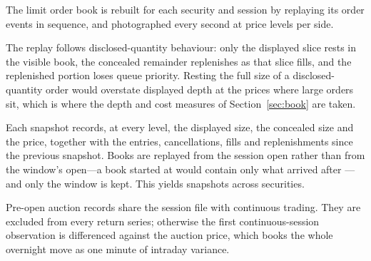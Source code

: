 The limit order book is rebuilt for each security and session by replaying its order events
in sequence, and photographed every \DesignSnapshotInterval{} second at
\DesignBookLevels{} price levels per side.

The replay follows disclosed-quantity behaviour: only the displayed slice rests in the
visible book, the concealed remainder replenishes as that slice fills, and the replenished
portion loses queue priority. Resting the full size of a disclosed-quantity order would
overstate displayed depth at the prices where large orders sit, which is where the depth and
cost measures of Section~\ref{sec:book} are taken.

Each snapshot records, at every level, the displayed size, the concealed size and the price,
together with the entries, cancellations, fills and replenishments since the previous
snapshot. Books are replayed from the session open rather than from the window's open---a
book started at \DesignWindowStart{} would contain only what arrived after
\DesignWindowStart{}---and only the window is kept. This yields \SampleSnapshots{} snapshots
across \SampleSnapshotSymbols{} securities.

Pre-open auction records share the session file with continuous trading. They are excluded
from every return series; otherwise the first continuous-session observation is differenced
against the auction price, which books the whole overnight move as one minute of intraday
variance.
